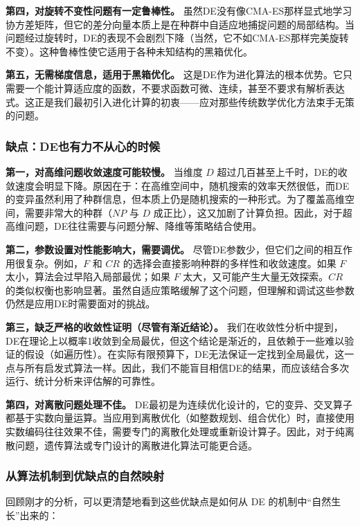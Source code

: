 \documentclass[lang=cn,zihao=-4,a4paper,fontset=windows]{beautybook}
\begin{document}
\textbf{第四，对旋转不变性问题有一定鲁棒性。} 虽然DE没有像CMA-ES那样显式地学习协方差矩阵，但它的差分向量本质上是在种群中自适应地捕捉问题的局部结构。当问题经过旋转时，DE的表现不会剧烈下降（当然，它不如CMA-ES那样完美旋转不变）。这种鲁棒性使它适用于各种未知结构的黑箱优化。

\textbf{第五，无需梯度信息，适用于黑箱优化。} 这是DE作为进化算法的根本优势。它只需要一个能计算适应度的函数，不要求函数可微、连续，甚至不要求有解析表达式。这正是我们最初引入进化计算的初衷——应对那些传统数学优化方法束手无策的问题。

\subsubsection*{缺点：DE也有力不从心的时候}

\textbf{第一，对高维问题收敛速度可能较慢。} 当维度 $D$ 超过几百甚至上千时，DE的收敛速度会明显下降。原因在于：在高维空间中，随机搜索的效率天然很低，而DE的变异虽然利用了种群信息，但本质上仍是随机搜索的一种形式。为了覆盖高维空间，需要非常大的种群（$NP$ 与 $D$ 成正比），这又加剧了计算负担。因此，对于超高维问题，DE往往需要与问题分解、降维等策略结合使用。

\textbf{第二，参数设置对性能影响大，需要调优。} 尽管DE参数少，但它们之间的相互作用很复杂。例如，$F$ 和 $CR$ 的选择会直接影响种群的多样性和收敛速度。如果 $F$ 太小，算法会过早陷入局部最优；如果 $F$ 太大，又可能产生大量无效探索。$CR$ 的类似权衡也影响显著。虽然自适应策略缓解了这个问题，但理解和调试这些参数仍然是应用DE时需要面对的挑战。

\textbf{第三，缺乏严格的收敛性证明（尽管有渐近结论）。} 我们在收敛性分析中提到，DE在理论上以概率1收敛到全局最优，但这个结论是渐近的，且依赖于一些难以验证的假设（如遍历性）。在实际有限预算下，DE无法保证一定找到全局最优，这一点与所有启发式算法一样。因此，我们不能盲目相信DE的结果，而应该结合多次运行、统计分析来评估解的可靠性。

\textbf{第四，对离散问题处理不佳。} DE最初是为连续优化设计的，它的变异、交叉算子都基于实数向量运算。当应用到离散优化（如整数规划、组合优化）时，直接使用实数编码往往效果不佳，需要专门的离散化处理或重新设计算子。因此，对于纯离散问题，遗传算法或专门设计的离散进化算法可能更合适。

\subsubsection*{从算法机制到优缺点的自然映射}

回顾刚才的分析，可以更清楚地看到这些优缺点是如何从 DE 的机制中“自然生长”出来的：
\end{document}
